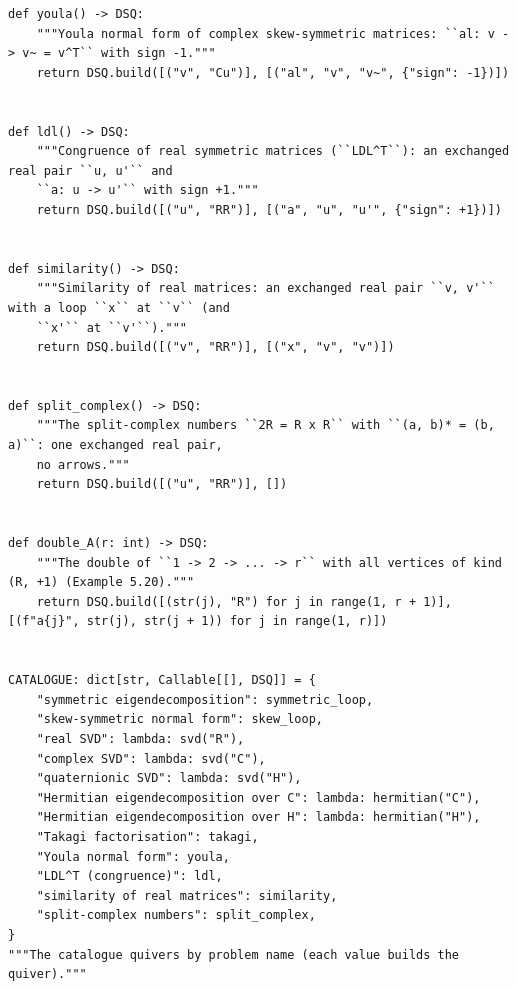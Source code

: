 \documentclass[12pt, a4paper]{report}
\theoremstyle{plain}
\theoremstyle{definition}
\theoremstyle{remark}
\theoremstyle{plain}
\begin{document}
\begin{lstlisting}[style=dsqcode]
def youla() -> DSQ:
    """Youla normal form of complex skew-symmetric matrices: ``al: v -> v~ = v^T`` with sign -1."""
    return DSQ.build([("v", "Cu")], [("al", "v", "v~", {"sign": -1})])


def ldl() -> DSQ:
    """Congruence of real symmetric matrices (``LDL^T``): an exchanged real pair ``u, u'`` and
    ``a: u -> u'`` with sign +1."""
    return DSQ.build([("u", "RR")], [("a", "u", "u'", {"sign": +1})])


def similarity() -> DSQ:
    """Similarity of real matrices: an exchanged real pair ``v, v'`` with a loop ``x`` at ``v`` (and
    ``x'`` at ``v'``)."""
    return DSQ.build([("v", "RR")], [("x", "v", "v")])


def split_complex() -> DSQ:
    """The split-complex numbers ``2R = R x R`` with ``(a, b)* = (b, a)``: one exchanged real pair,
    no arrows."""
    return DSQ.build([("u", "RR")], [])


def double_A(r: int) -> DSQ:
    """The double of ``1 -> 2 -> ... -> r`` with all vertices of kind (R, +1) (Example 5.20)."""
    return DSQ.build([(str(j), "R") for j in range(1, r + 1)], [(f"a{j}", str(j), str(j + 1)) for j in range(1, r)])


CATALOGUE: dict[str, Callable[[], DSQ]] = {
    "symmetric eigendecomposition": symmetric_loop,
    "skew-symmetric normal form": skew_loop,
    "real SVD": lambda: svd("R"),
    "complex SVD": lambda: svd("C"),
    "quaternionic SVD": lambda: svd("H"),
    "Hermitian eigendecomposition over C": lambda: hermitian("C"),
    "Hermitian eigendecomposition over H": lambda: hermitian("H"),
    "Takagi factorisation": takagi,
    "Youla normal form": youla,
    "LDL^T (congruence)": ldl,
    "similarity of real matrices": similarity,
    "split-complex numbers": split_complex,
}
"""The catalogue quivers by problem name (each value builds the quiver)."""
\end{lstlisting}
\end{document}
